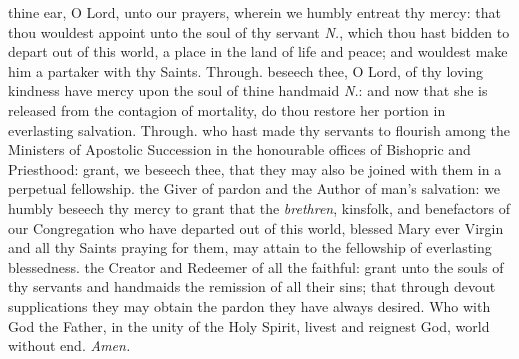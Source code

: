  thine ear, O Lord, unto our prayers, wherein we humbly entreat thy mercy: that thou wouldest appoint unto the soul of thy servant \textit{N.}, which thou hast bidden to depart out of this world, a place in the land of life and peace; and wouldest make him a partaker with thy Saints. Through.
 beseech thee, O Lord, of thy loving kindness have mercy upon the soul of thine handmaid \textit{N.}: and now that she is released from the contagion of mortality, do thou restore her portion in everlasting salvation. Through.
 who hast made thy servants to flourish among the Ministers of Apostolic Succession in the honourable offices of Bishopric and Priesthood: grant, we beseech thee, that they may also be joined with them in a perpetual fellowship.
 the Giver of pardon and the Author of man's salvation: we humbly beseech thy mercy to grant that the \textit{brethren}, kinsfolk, and benefactors of our Congregation who have departed out of this world, blessed Mary ever Virgin and all thy Saints praying for them, may attain to the fellowship of everlasting blessedness.
 the Creator and Redeemer of all the faithful: grant unto the souls of thy servants and handmaids the remission of all their sins; that through devout supplications they may obtain the pardon they have always desired. Who with God the Father, in the unity of the Holy Spirit, livest and reignest God, world without end. \textit{Amen.}


